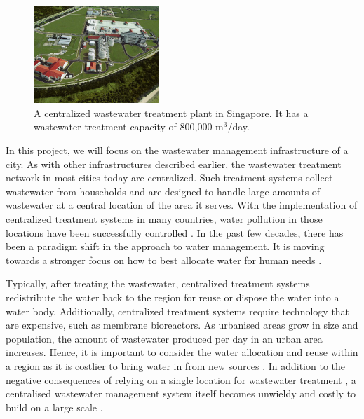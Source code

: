 \documentclass[preprint,12pt,authoryear]{elsarticle}
\begin{document}
\begin{figure}
	\begin{center}
		\includegraphics[width=0.42\textwidth]{changiwrp.jpg}
	\end{center}
	\caption[A centralized wastewater treatment plant in Singapore.]{A centralized wastewater treatment plant in Singapore. It has a wastewater treatment capacity of 800,000 m$^3/$day. \citep{changiwrp}} 
	\label{fig:changi}
\end{figure}%
In this project, we will focus on the wastewater management infrastructure of a city. As with other infrastructures described earlier, the wastewater treatment network in most cities today are centralized. Such treatment systems collect wastewater from households and are designed to handle large amounts of wastewater at a central location of the area it serves. With the implementation of centralized treatment systems in many countries, water pollution in those locations have been successfully controlled \citep{li2014}. In the past few decades, there has been a paradigm shift in the approach to water management. It is moving towards a stronger focus on how to best allocate water for human needs \citep{gleick2000}.



Typically, after treating the wastewater, centralized treatment systems redistribute the water back to the region for reuse or dispose the water into a water body. Additionally, centralized treatment systems require technology that are expensive, such as membrane bioreactors. As urbanised areas grow in size and population, the amount of wastewater produced per day in an urban area increases. Hence, it is important to consider the water allocation and reuse within a region as it is costlier to bring water in from new sources \citep{gleick2000}. In addition to the negative consequences of relying on a single location for wastewater treatment \citep{wilderer2000,bakir2001}, a centralised wastewater management system itself becomes unwieldy and costly to build on a large scale \citep{wilderer2000}.
\end{document}
